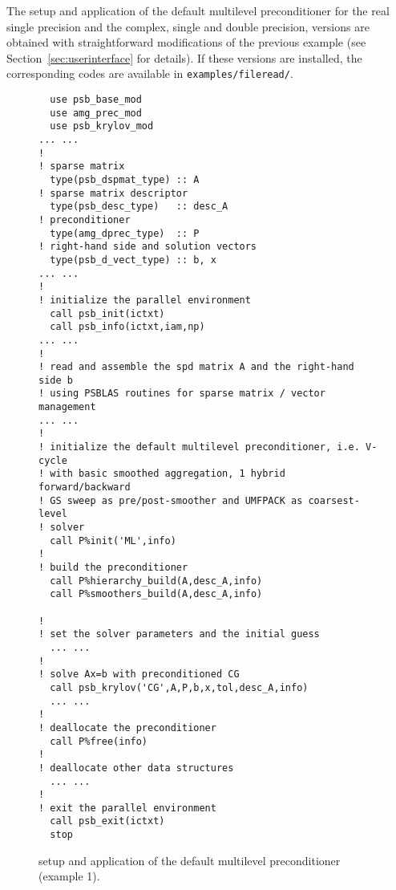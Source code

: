 The setup and application of the default multilevel preconditioner
for the real single precision and the complex, single and double
precision, versions are obtained with straightforward modifications of the previous
example (see Section~\ref{sec:userinterface} for details). If these versions are installed,
the corresponding codes are available in \verb|examples/fileread/|.

\begin{figure}[tbp]
\begin{center}
\begin{minipage}{.90\textwidth}
{\small
\begin{verbatim}
  use psb_base_mod
  use amg_prec_mod
  use psb_krylov_mod
... ...
!
! sparse matrix
  type(psb_dspmat_type) :: A
! sparse matrix descriptor
  type(psb_desc_type)   :: desc_A
! preconditioner
  type(amg_dprec_type)  :: P
! right-hand side and solution vectors
  type(psb_d_vect_type) :: b, x
... ...
!
! initialize the parallel environment
  call psb_init(ictxt)
  call psb_info(ictxt,iam,np)
... ...
!
! read and assemble the spd matrix A and the right-hand side b
! using PSBLAS routines for sparse matrix / vector management
... ...
!
! initialize the default multilevel preconditioner, i.e. V-cycle
! with basic smoothed aggregation, 1 hybrid forward/backward
! GS sweep as pre/post-smoother and UMFPACK as coarsest-level
! solver
  call P%init('ML',info)
!
! build the preconditioner
  call P%hierarchy_build(A,desc_A,info)
  call P%smoothers_build(A,desc_A,info)

!
! set the solver parameters and the initial guess
  ... ...
!
! solve Ax=b with preconditioned CG
  call psb_krylov('CG',A,P,b,x,tol,desc_A,info)
  ... ...
!
! deallocate the preconditioner
  call P%free(info)
!
! deallocate other data structures
  ... ...
!
! exit the parallel environment
  call psb_exit(ictxt)
  stop
\end{verbatim}
}
\end{minipage}
\caption{setup and application of the default multilevel preconditioner (example 1).
\label{fig:ex1}}
\end{center}
\end{figure}

